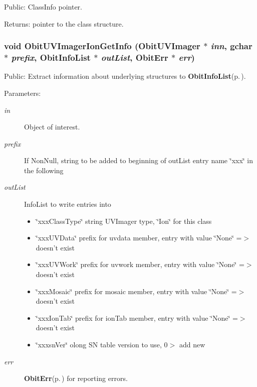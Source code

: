 Public: Class\-Info pointer. 

\begin{Desc}
\item[Returns:]pointer to the class structure. \end{Desc}
\subsubsection{\setlength{\rightskip}{0pt plus 5cm}void Obit\-UVImager\-Ion\-Get\-Info ({\bf Obit\-UVImager} $\ast$ {\em inn}, gchar $\ast$ {\em prefix}, {\bf Obit\-Info\-List} $\ast$ {\em out\-List}, {\bf Obit\-Err} $\ast$ {\em err})}\label{ObitUVImagerIon_8h_a15}


Public: Extract information about underlying structures to {\bf Obit\-Info\-List}{\rm (p.\,\pageref{structObitInfoList})}. 

\begin{Desc}
\item[Parameters:]
\begin{description}
\item[{\em in}]Object of interest. \item[{\em prefix}]If Non\-Null, string to be added to beginning of out\-List entry name \char`\"{}xxx\char`\"{} in the following \item[{\em out\-List}]Info\-List to write entries into \begin{itemize}
\item \char`\"{}xxx\-Class\-Type\char`\"{} string UVImager type, \char`\"{}Ion\char`\"{} for this class \item \char`\"{}xxx\-UVData\char`\"{} prefix for uvdata member, entry with value \char`\"{}None\char`\"{} =$>$ doesn't exist \item \char`\"{}xxx\-UVWork\char`\"{} prefix for uvwork member, entry with value \char`\"{}None\char`\"{} =$>$ doesn't exist \item \char`\"{}xxx\-Mosaic\char`\"{} prefix for mosaic member, entry with value \char`\"{}None\char`\"{} =$>$ doesn't exist \item \char`\"{}xxx\-Ion\-Tab\char`\"{} prefix for ion\-Tab member, entry with value \char`\"{}None\char`\"{} =$>$ doesn't exist \item \char`\"{}xxxsn\-Ver\char`\"{} olong SN table version to use, 0$>$ add new \end{itemize}
\item[{\em err}]{\bf Obit\-Err}{\rm (p.\,\pageref{structObitErr})} for reporting errors. \end{description}
\end{Desc}
